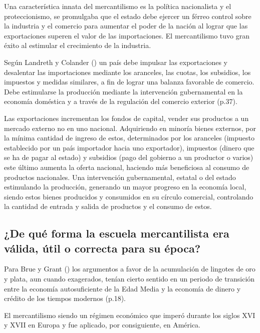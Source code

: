 \documentclass[
  jou,
  floatsintext,
  longtable,
  a4paper,
  nolmodern,
  notxfonts,
  notimes,
  colorlinks=true,linkcolor=blue,citecolor=blue,urlcolor=blue]{apa7}
\begin{document}
Una característica innata del mercantilismo es la política nacionalista
y el proteccionismo, se promulgaba que el estado debe ejercer un férreo
control sobre la industria y el comercio para aumentar el poder de la
nación al lograr que las exportaciones superen el valor de las
importaciones. El mercantilismo tuvo gran éxito al estimular el
crecimiento de la industria.

Según Landreth y Colander
() un país debe
impulsar las exportaciones y desalentar las importaciones mediante los
aranceles, las cuotas, los subsidios, los impuestos y medidas similares,
a fin de lograr una balanza favorable de comercio. Debe estimularse la
producción mediante la intervención gubernamental en la economía
doméstica y a través de la regulación del comercio exterior (p.37).

Las exportaciones incrementan los fondos de capital, vender sus
productos a un mercado externo no en uno nacional. Adquiriendo en
minoría bienes externos, por la mínima cantidad de ingreso de estos,
determinados por los aranceles (impuesto establecido por un país
importador hacia uno exportador), impuestos (dinero que se ha de pagar
al estado) y subsidios (pago del gobierno a un productor o varios) este
último aumenta la oferta nacional, haciendo más beneficiosa al consumo
de productos nacionales. Una intervención gubernamental, estatal o del
estado estimulando la producción, generando un mayor progreso en la
economía local, siendo estos bienes producidos y consumidos en su
círculo comercial, controlando la cantidad de entrada y salida de
productos y el consumo de estos.

\subsection{¿De qué forma la escuela mercantilista era válida, útil o
correcta para su
época?}\label{de-quuxe9-forma-la-escuela-mercantilista-era-vuxe1lida-uxfatil-o-correcta-para-su-uxe9poca}

Para Brue y Grant
() los
argumentos a favor de la acumulación de lingotes de oro y plata, aun
cuando exagerados, tenían cierto sentido en un periodo de transición
entre la economía autosuficiente de la Edad Media y la economía de
dinero y crédito de los tiempos modernos (p.18).

El mercantilismo siendo un régimen económico que imperó durante los
siglos XVI y XVII en Europa y fue aplicado, por consiguiente, en
América.
\end{document}
